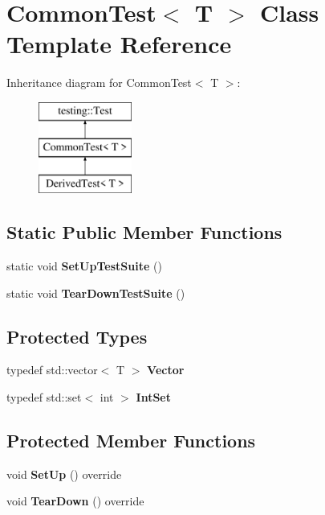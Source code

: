 \hypertarget{classCommonTest}{}\section{Common\+Test$<$ T $>$ Class Template Reference}
\label{classCommonTest}
Inheritance diagram for Common\+Test$<$ T $>$\+:\begin{figure}[H]
\begin{center}
\leavevmode
\includegraphics[height=3.000000cm]{classCommonTest}
\end{center}
\end{figure}
\subsection*{Static Public Member Functions}
\begin{DoxyCompactItemize}
\item 
\mbox{\label{classCommonTest_a34d4de46bf01a38d305277a9b83c67a1}} 
static void {\bfseries Set\+Up\+Test\+Suite} ()
\item 
\mbox{\label{classCommonTest_a1ed5842244ccca6c3bee6eb9e3b8bc9b}} 
static void {\bfseries Tear\+Down\+Test\+Suite} ()
\end{DoxyCompactItemize}
\subsection*{Protected Types}
\begin{DoxyCompactItemize}
\item 
\mbox{\label{classCommonTest_a6dfdcede6964887b9f4254a0e0478e37}} 
typedef std\+::vector$<$ T $>$ {\bfseries Vector}
\item 
\mbox{\label{classCommonTest_a62827e9d3064cddf4a8698747f1bd434}} 
typedef std\+::set$<$ int $>$ {\bfseries Int\+Set}
\end{DoxyCompactItemize}
\subsection*{Protected Member Functions}
\begin{DoxyCompactItemize}
\item 
\mbox{\label{classCommonTest_a4d98ceceb09fb614ff53e59e0695ea91}} 
void {\bfseries Set\+Up} () override
\item 
\mbox{\label{classCommonTest_a5e851b64ff1f73cb79b4dbd1d39fd075}} 
void {\bfseries Tear\+Down} () override
\end{DoxyCompactItemize}
